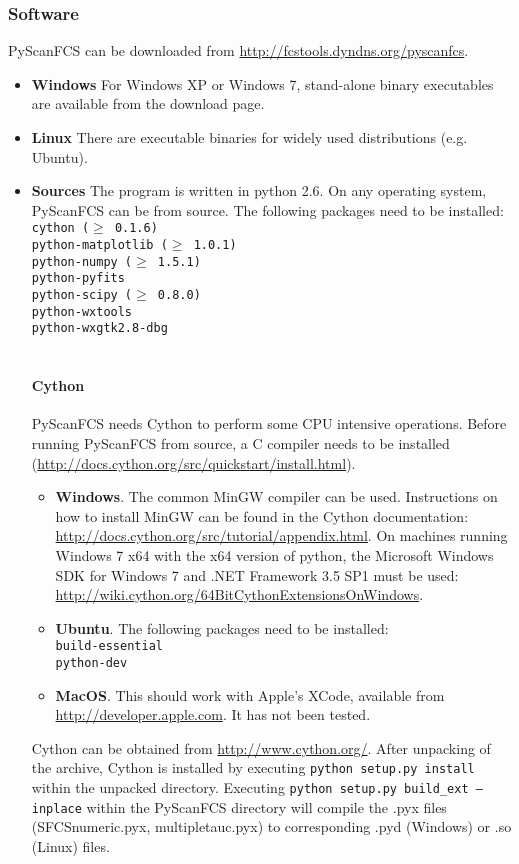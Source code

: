 \subsubsection*{Software}
PyScanFCS can be downloaded from \url{http://fcstools.dyndns.org/pyscanfcs}.
\begin{itemize}
\item \textbf{Windows}
For Windows XP or Windows 7, stand-alone binary executables are available from the download page. 
\item \textbf{Linux}
There are executable binaries for widely used distributions (e.g. Ubuntu).
\item \textbf{Sources}
The program is written in python 2.6. On any operating system, PyScanFCS can be from source. The following packages need to be installed:
\texttt{\\
cython ($\geq$ 0.1.6)\\
python-matplotlib ($\geq$ 1.0.1) \\
python-numpy ($\geq$ 1.5.1) \\
python-pyfits \\
python-scipy ($\geq$ 0.8.0) \\
python-wxtools \\
python-wxgtk2.8-dbg \\
}
\\

\paragraph*{Cython}
PyScanFCS needs Cython to perform some CPU intensive operations. Before running PyScanFCS from source, a C compiler needs to be installed (\url{http://docs.cython.org/src/quickstart/install.html}).
\begin{itemize}
\item[ ] \textbf{Windows}. The common MinGW compiler can be used. Instructions on how to install MinGW can be found in the Cython documentation: \url{http://docs.cython.org/src/tutorial/appendix.html}. On machines running Windows 7 x64 with the x64 version of python, the Microsoft Windows SDK for Windows 7 and .NET Framework 3.5 SP1 must be used: \\
\url{http://wiki.cython.org/64BitCythonExtensionsOnWindows}.

\item[ ] \textbf{Ubuntu}. The following packages need to be installed:
\\
\texttt{build-essential\\
python-dev} 
\item[ ] \textbf{MacOS}. This should work with Apple's XCode, available from \url{http://developer.apple.com}. It has not been tested.
\end{itemize}
Cython can be obtained from \url{http://www.cython.org/}. After unpacking of the archive, Cython is installed by executing \texttt{python setup.py install} within the unpacked directory. Executing \texttt{python setup.py build{\_}ext --inplace} within the PyScanFCS directory will compile the \mytilde .pyx files (SFCSnumeric.pyx, multipletauc.pyx) to corresponding \mytilde .pyd (Windows) or \mytilde .so (Linux) files.


\end{itemize}
